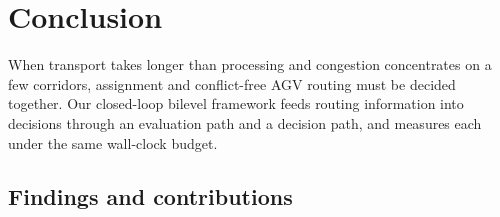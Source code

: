 \begin{table}[t]
\caption{Degenerate comparison on public benchmarks (exclusivity removed). \textsc{opt}: MILP-proven optimum; \textsc{bk}: best published value; gap from the best of \NSeeds{} seeds; asterisk: identical to the reference.}
\label{tab:external}
\centering
\small

\end{table}



\section{Conclusion}

When transport takes longer than processing and congestion concentrates on a few corridors, assignment and conflict-free AGV routing must be decided together. Our closed-loop bilevel framework feeds routing information into decisions through an evaluation path and a decision path, and measures each under the same wall-clock budget.

\subsection{Findings and contributions}
\label{sec:contributions}

